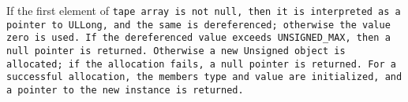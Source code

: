 If the first element of \tt{tape} array is not null,
then it is interpreted as a pointer to \tt{ULLong},
and the same is dereferenced; otherwise the value zero is used.
If the dereferenced value exceeds \tt{UNSIGNED_MAX}, then a
null pointer is returned. Otherwise a new \tt{Unsigned} object
is allocated; if the allocation fails, a null pointer is returned.
For a successful allocation, the members \tt{type} and \tt{value}
are initialized, and a pointer to the new instance is returned.

